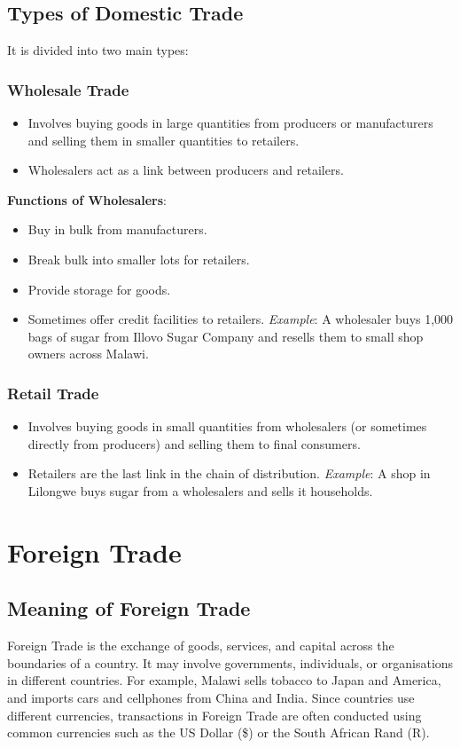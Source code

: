 \documentclass[14pt,a4paper, openany]{book}
\begin{document}
\subsection{Types of Domestic Trade}
It is divided into two main types:
\subsubsection{Wholesale Trade}
\begin{itemize}
	\item Involves buying goods in large quantities from producers or manufacturers and selling them in smaller
	      quantities to retailers.
	\item Wholesalers act as a link between producers and retailers.
\end{itemize}
\textbf{Functions of Wholesalers}:
\begin{itemize}
	\item Buy in bulk from manufacturers.
	\item Break bulk into smaller lots for retailers.
	\item Provide storage for goods.
	\item Sometimes offer credit facilities to retailers.
	      \textit{Example}: A wholesaler buys 1,000 bags of sugar from Illovo Sugar Company and resells them
	      to small shop owners across Malawi.
\end{itemize}
\subsubsection{Retail Trade}
\begin{itemize}
	\item Involves buying goods in small quantities from wholesalers (or sometimes directly from producers)
	      and selling them to final consumers.
	\item Retailers are the last link in the chain of distribution.
	      \textit{Example}: A shop in Lilongwe buys sugar from a wholesalers and sells it households.
\end{itemize}
\section{Foreign Trade}

\subsection{Meaning of Foreign Trade}
Foreign Trade is the exchange of goods, services, and capital across the boundaries of a country.
It may involve governments, individuals, or organisations in different countries.
For example, Malawi sells tobacco to Japan and America, and imports cars and cellphones from China and India.
Since countries use different currencies, transactions in Foreign Trade are often conducted using common currencies such as the US Dollar (\$) or the South African Rand (R).
\end{document}
